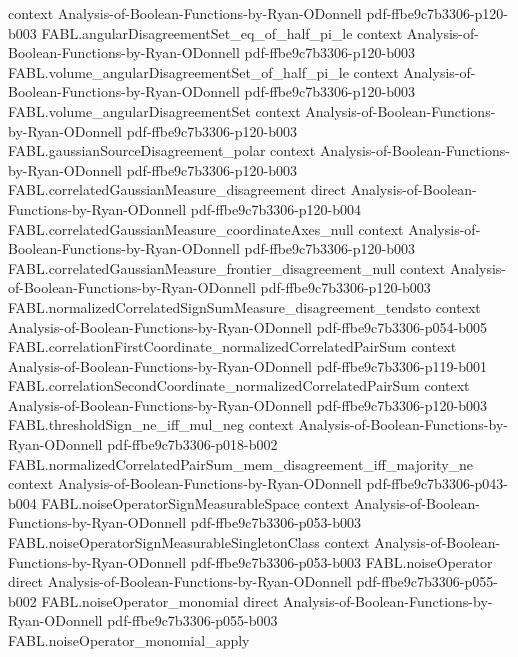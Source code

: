 \begin{theorem}
  {context}
  {Analysis-of-Boolean-Functions-by-Ryan-ODonnell}
  {pdf-ffbe9c7b3306-p120-b003}
\proofstep
  {FABL.angularDisagreementSet_eq_of_half_pi_le}
  {context}
  {Analysis-of-Boolean-Functions-by-Ryan-ODonnell}
  {pdf-ffbe9c7b3306-p120-b003}
\proofstep
  {FABL.volume_angularDisagreementSet_of_half_pi_le}
  {context}
  {Analysis-of-Boolean-Functions-by-Ryan-ODonnell}
  {pdf-ffbe9c7b3306-p120-b003}
\proofstep
  {FABL.volume_angularDisagreementSet}
  {context}
  {Analysis-of-Boolean-Functions-by-Ryan-ODonnell}
  {pdf-ffbe9c7b3306-p120-b003}
\proofstep
  {FABL.gaussianSourceDisagreement_polar}
  {context}
  {Analysis-of-Boolean-Functions-by-Ryan-ODonnell}
  {pdf-ffbe9c7b3306-p120-b003}
\proofstep
  {FABL.correlatedGaussianMeasure_disagreement}
  {direct}
  {Analysis-of-Boolean-Functions-by-Ryan-ODonnell}
  {pdf-ffbe9c7b3306-p120-b004}
\proofstep
  {FABL.correlatedGaussianMeasure_coordinateAxes_null}
  {context}
  {Analysis-of-Boolean-Functions-by-Ryan-ODonnell}
  {pdf-ffbe9c7b3306-p120-b003}
\proofstep
  {FABL.correlatedGaussianMeasure_frontier_disagreement_null}
  {context}
  {Analysis-of-Boolean-Functions-by-Ryan-ODonnell}
  {pdf-ffbe9c7b3306-p120-b003}
\proofstep
  {FABL.normalizedCorrelatedSignSumMeasure_disagreement_tendsto}
  {context}
  {Analysis-of-Boolean-Functions-by-Ryan-ODonnell}
  {pdf-ffbe9c7b3306-p054-b005}
\proofstep
  {FABL.correlationFirstCoordinate_normalizedCorrelatedPairSum}
  {context}
  {Analysis-of-Boolean-Functions-by-Ryan-ODonnell}
  {pdf-ffbe9c7b3306-p119-b001}
\proofstep
  {FABL.correlationSecondCoordinate_normalizedCorrelatedPairSum}
  {context}
  {Analysis-of-Boolean-Functions-by-Ryan-ODonnell}
  {pdf-ffbe9c7b3306-p120-b003}
\proofstep
  {FABL.thresholdSign_ne_iff_mul_neg}
  {context}
  {Analysis-of-Boolean-Functions-by-Ryan-ODonnell}
  {pdf-ffbe9c7b3306-p018-b002}
\proofstep
  {FABL.normalizedCorrelatedPairSum_mem_disagreement_iff_majority_ne}
  {context}
  {Analysis-of-Boolean-Functions-by-Ryan-ODonnell}
  {pdf-ffbe9c7b3306-p043-b004}
\proofstep
  {FABL.noiseOperatorSignMeasurableSpace}
  {context}
  {Analysis-of-Boolean-Functions-by-Ryan-ODonnell}
  {pdf-ffbe9c7b3306-p053-b003}
\proofstep
  {FABL.noiseOperatorSignMeasurableSingletonClass}
  {context}
  {Analysis-of-Boolean-Functions-by-Ryan-ODonnell}
  {pdf-ffbe9c7b3306-p053-b003}
\proofstep
  {FABL.noiseOperator}
  {direct}
  {Analysis-of-Boolean-Functions-by-Ryan-ODonnell}
  {pdf-ffbe9c7b3306-p055-b002}
\proofstep
  {FABL.noiseOperator_monomial}
  {direct}
  {Analysis-of-Boolean-Functions-by-Ryan-ODonnell}
  {pdf-ffbe9c7b3306-p055-b003}
\proofstep
  {FABL.noiseOperator_monomial_apply}

\end{theorem}
